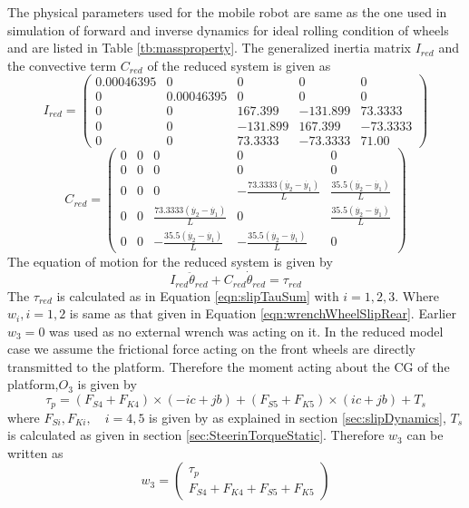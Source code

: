 {The physical parameters used for the mobile robot are same as the one used in simulation of forward and inverse dynamics for ideal rolling condition of wheels and  are listed in Table \ref{tb:massproperty}.
The generalized inertia  matrix $I_{red}$  and the convective term $ C_{red}$ of the reduced system is given as
\begin{equation}
I_{red}=\left(
\begin{array}{ccccc}
0.00046395 & 0 & 0 & 0 & 0 \\
0 & 0.00046395 & 0 & 0 & 0 \\
0 & 0 & 167.399 & -131.899 & 73.3333 \\
0 & 0 & -131.899 & 167.399 & -73.3333 \\
0 & 0 & 73.3333 & -73.3333 & 71.00
\end{array}
\right)
\end{equation}
\begin{equation}
C_{red}=\left(
\begin{array}{ccccc}
0 & 0 & 0 & 0 & 0 \\
0 & 0 & 0 & 0 & 0 \\
0 & 0 & 0 & -\frac{73.3333 (\dot{y_2} - \dot{y_1})}{L} & \frac{35.5 (\dot{y_2} - \dot{y_1})}{L} \\
0 & 0 & \frac{73.3333 (\dot{y_2} - \dot{y_1})}{L} & 0 & \frac{35.5 (\dot{y_2} - \dot{y_1})}{L} \\
0 & 0 & -\frac{35.5 (\dot{y_2} - \dot{y_1})}{L} & -\frac{35.5 (\dot{y_2} - \dot{y_1})}{L} & 0
\end{array}
\right)
\end{equation}
The equation of motion for the reduced system is given by 
\begin{equation}
I_{red}\ddot{\theta}_{red}+C_{red}\dot{\theta}_{red}=\tau_{red}
\end{equation}
The $\tau_{red}$ is calculated as in Equation \ref{eqn:slipTauSum} with $i=1,2,3 $. Where $w_i, i=1,2$ is same as that given in Equation \ref{eqn:wrenchWheelSlipRear}.
Earlier $w_3=0$ was used as no external wrench was acting on it. In the reduced model case we assume the frictional force acting on the front wheels are directly transmitted to the platform. Therefore the moment acting about the CG of the platform,$O_3$ is given by
\begin{equation}
 	\label{eqn:redPlatMoment}
 	\tau_{p}=(F_{S4}+F_{K4}) \times (-i c+jb) +(F_{S5}+F_{K5}) \times (i c+jb) +T_s
\end{equation}
where $F_{Si},F_{Ki},\quad i=4,5$ is given by as explained in section \ref{sec:slipDynamics}, $T_s$ is calculated as given  in section \ref{sec:SteerinTorqueStatic}.
Therefore $w_3$ can be written as 
\begin{equation}
w_3=\begin{pmatrix}
\tau_{p}\\
F_{S4}+F_{K4}+F_{S5}+F_{K5}
\end{pmatrix}
\end{equation}

}
